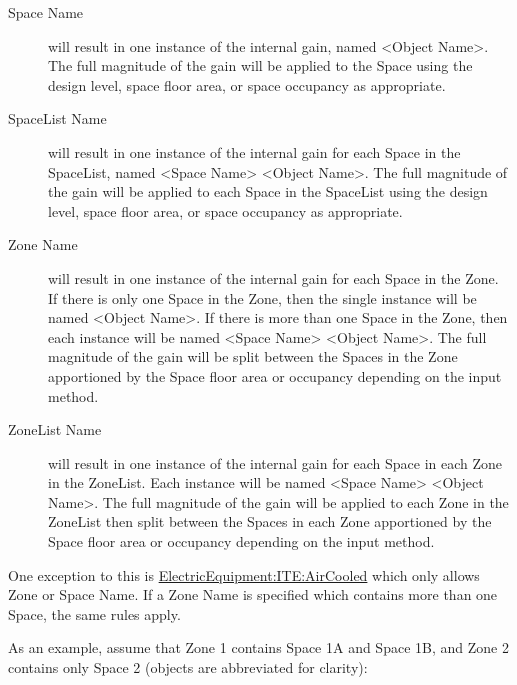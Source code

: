 \begin{description}
  \item[Space Name] will result in one instance of the internal gain, named \textless{}Object Name\textgreater{}. The full magnitude of the gain will be applied to the Space using the design level, space floor area, or space occupancy as appropriate.
  \item[SpaceList Name] will result in one instance of the internal gain for each Space in the SpaceList, named \textless{}Space Name\textgreater{} \textless{}Object Name\textgreater{}. The full magnitude of the gain will be applied to each Space in the SpaceList using the design level, space floor area, or space occupancy as appropriate.
  \item[Zone Name] will result in one instance of the internal gain for each Space in the Zone. If there is only one Space in the Zone, then the single instance will be named \textless{}Object Name\textgreater{}. If there is more than one Space in the Zone, then each instance will be named \textless{}Space Name\textgreater{} \textless{}Object Name\textgreater{}. The full magnitude of the gain will be split between the Spaces in the Zone apportioned by the Space floor area or occupancy depending on the input method.
  \item[ZoneList Name] will result in one instance of the internal gain for each Space in each Zone in the ZoneList. Each instance will be named \textless{}Space Name\textgreater{} \textless{}Object Name\textgreater{}.
  The full magnitude of the gain will be applied to each Zone in the ZoneList then split between the Spaces in each Zone apportioned by the Space floor area or occupancy depending on the input method.
\end{description}

One exception to this is \hyperref[electricequipmentiteaircooled]{ElectricEquipment:ITE:AirCooled}
which only allows Zone or Space Name. If a Zone Name is specified which contains more than one Space, the same rules apply.

As an example, assume that Zone 1 contains Space 1A and Space 1B, and Zone 2 contains only Space 2 (objects are abbreviated for clarity):

